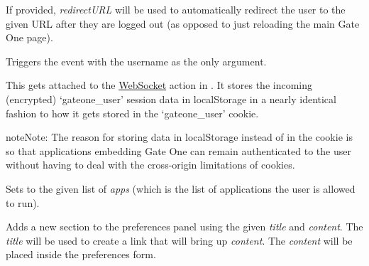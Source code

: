 \documentclass[letterpaper,10pt,openany]{sphinxmanual}
\begin{document}
\begin{fulllineitems}
\begin{fulllineitems}
\begin{fulllineitems}
If provided, \emph{redirectURL} will be used to automatically redirect the user to the given URL after they are logged out (as opposed to just reloading the main Gate One page).

Triggers the  event with the username as the only argument.

\end{fulllineitems}



\begin{fulllineitems}
\label{Developer/js_gateone:GateOne.User.storeSessionAction}
This gets attached to the  \href{https://developer.mozilla.org/en/WebSockets/WebSockets\_reference/WebSocket}{WebSocket} action in {\hyperref[Developer/js_gateone:GateOne.Net.actions]{}}.  It stores the incoming (encrypted) `gateone\_user' session data in localStorage in a nearly identical fashion to how it gets stored in the `gateone\_user' cookie.

\begin{notice}{note}{Note:}
The reason for storing data in localStorage instead of in the cookie is so that applications embedding Gate One can remain authenticated to the user without having to deal with the cross-origin limitations of cookies.
\end{notice}

\end{fulllineitems}



\begin{fulllineitems}
\label{Developer/js_gateone:GateOne.User.applicationsAction}
Sets  to the given list of \emph{apps} (which is the list of applications the user is allowed to run).

\end{fulllineitems}



\begin{fulllineitems}
\label{Developer/js_gateone:GateOne.User.preference}
Adds a new section to the preferences panel using the given \emph{title} and \emph{content}.  The \emph{title} will be used to create a link that will bring up \emph{content}.  The \emph{content} will be placed inside the preferences form.


\end{fulllineitems}
\end{fulllineitems}
\end{fulllineitems}
\end{document}
